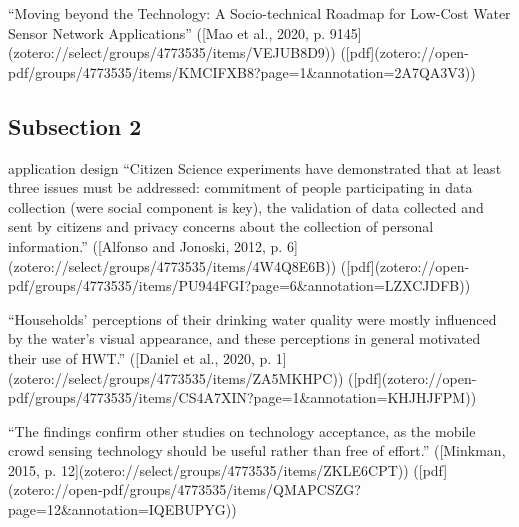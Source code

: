 “Moving beyond the Technology: A Socio-technical Roadmap for Low-Cost Water Sensor Network Applications” ([Mao et al., 2020, p. 9145](zotero://select/groups/4773535/items/VEJUB8D9)) ([pdf](zotero://open-pdf/groups/4773535/items/KMCIFXB8?page=1&annotation=2A7QA3V3))


\subsection{Subsection 2}

application design 
“Citizen Science experiments have demonstrated that at least three issues must be addressed: commitment of people participating in data collection (were social component is key), the validation of data collected and sent by citizens and privacy concerns about the collection of personal information.” ([Alfonso and Jonoski, 2012, p. 6](zotero://select/groups/4773535/items/4W4Q8E6B)) ([pdf](zotero://open-pdf/groups/4773535/items/PU944FGI?page=6\&annotation=LZXCJDFB))

“Households’ perceptions of their drinking water quality were mostly influenced by the water’s visual appearance, and these perceptions in general motivated their use of HWT.” ([Daniel et al., 2020, p. 1](zotero://select/groups/4773535/items/ZA5MKHPC)) ([pdf](zotero://open-pdf/groups/4773535/items/CS4A7XIN?page=1&annotation=KHJHJFPM))

“The findings confirm other studies on technology acceptance, as the mobile crowd sensing technology should be useful rather than free of effort.” ([Minkman, 2015, p. 12](zotero://select/groups/4773535/items/ZKLE6CPT)) ([pdf](zotero://open-pdf/groups/4773535/items/QMAPCSZG?page=12&annotation=IQEBUPYG))



